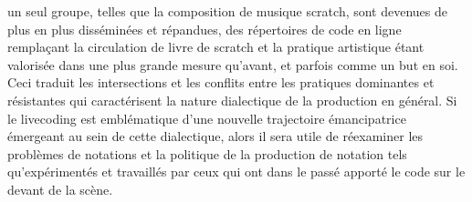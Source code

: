 {un seul groupe, telles que la composition de musique scratch, sont
devenues de plus en plus diss\'emin\'ees et r\'epandues, des
r\'epertoires de code en ligne rempla\c{c}ant la circulation de livre
de scratch et la pratique artistique \'etant valoris\'ee dans une plus
grande mesure qu'avant, et parfois comme un but en soi. Ceci traduit
les intersections et les conflits entre les pratiques dominantes et
r\'esistantes qui caract\'erisent la nature dialectique de la
production en g\'en\'eral. Si le livecoding est embl\'ematique d'une
nouvelle trajectoire \'emancipatrice \'emergeant au sein de cette
dialectique, alors il sera utile de r\'eexaminer les probl\`emes de
notations et la politique de la production de notation tels
qu'exp\'eriment\'es et travaill\'es par ceux qui ont dans le pass\'e
apport\'e le code sur le devant de la sc\`ene.}
